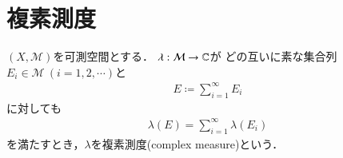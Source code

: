 \section{複素測度}

	\begin{screen}
		\begin{dfn}[複素測度]
			$(X,\mathcal{M})$を可測空間とする．
			$\lambda: \mathcal{M} \rightarrow \mathbb{C}$が
			どの互いに素な集合列$E_i \in \mathcal{M}\ (i=1,2,\cdots)$と
			\begin{align}
				E \coloneqq \sum_{i=1}^{\infty} E_i
			\end{align}
			に対しても
			\begin{align}
				\lambda(E) = \sum_{i=1}^{\infty} \lambda(E_i)
				\label{eq:dfn_complex_measure}
			\end{align}
			を満たすとき，$\lambda$を複素測度(complex measure)という．
		\end{dfn}
	\end{screen}
	
